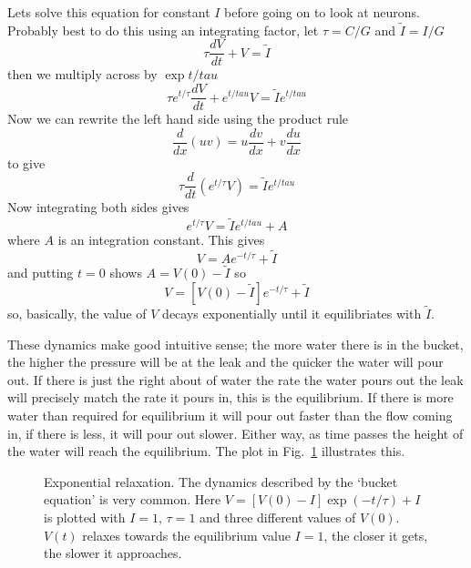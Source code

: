\documentclass[11pt,a4paper]{scrartcl}
\begin{document}
Lets solve this equation for constant $I$ before going on to look at
neurons. Probably best to do this using an integrating factor, let
$\tau=C/G$ and $\tilde{I}=I/G$
\begin{equation}
\tau\frac{dV}{dt}+V=\tilde{I}
\end{equation}
then we multiply across by $\exp{t/tau}$
\begin{equation}
\tau e^{t/\tau}\frac{dV}{dt}+e^{t/tau}V=\tilde{I}e^{t/tau}
\end{equation}
Now we can rewrite the left hand side using the product rule
\begin{equation}
\frac{d}{dx}(uv)=u\frac{dv}{dx}+v\frac{du}{dx}
\end{equation}
to give
\begin{equation}
\tau\frac{d}{dt}\left(e^{t/\tau}V\right)=\tilde{I}e^{t/tau}
\end{equation}
Now integrating both sides gives
\begin{equation}
e^{t/\tau}V=\tilde{I}e^{t/tau}+A
\end{equation}
where $A$ is an integration constant. This gives
\begin{equation}
V=Ae^{-t/\tau}+\tilde{I}
\end{equation}
and putting $t=0$ shows $A=V(0)-\tilde{I}$ so
\begin{equation}
V=[V(0)-\tilde{I}]e^{-t/\tau}+\tilde{I}
\end{equation}
so, basically, the value of $V$ decays exponentially until it
equilibriates with $\tilde{I}$.

These dynamics make good intuitive sense; the more water there is in
the bucket, the higher the pressure will be at the leak and the
quicker the water will pour out. If there is just the right about of
water the rate the water pours out the leak will precisely match the
rate it pours in, this is the equilibrium. If there is more water than required for equilibrium it will pour out faster than the flow coming in, if there is less, it will pour out slower. Either way, as time passes the height of the water will reach the equilibrium. The plot in Fig.~\ref{bucket_v} illustrates this.

\begin{figure}
\begin{center}

\end{center}
\caption{Exponential relaxation. The dynamics described by the
  \lq{}bucket equation\rq{} is very common. Here $V=[V(0)-I]\exp(-t/\tau)+I$ is plotted with $I=1$, $\tau=1$ and three different values of $V(0)$. $V(t)$ relaxes towards the equilibrium value $I=1$, the closer it gets, the slower it approaches.\label{bucket_v}}
\end{figure}
\end{document}
